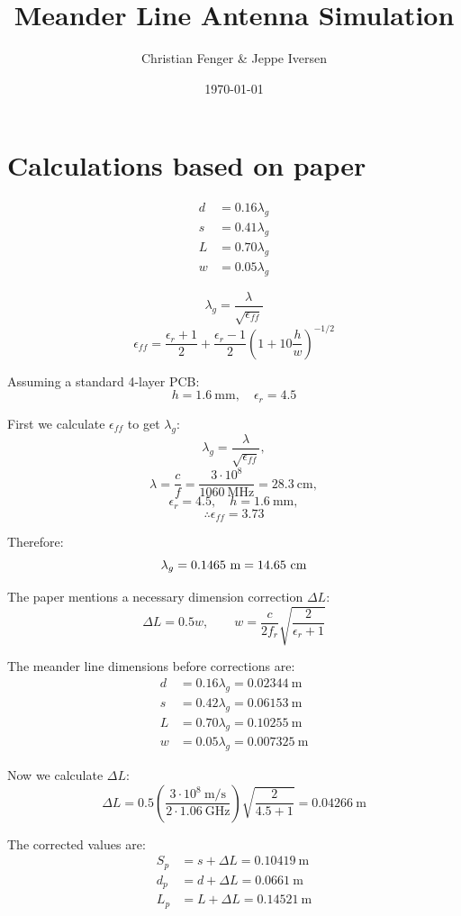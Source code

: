 \documentclass[a4paper,12pt]{article}
\title{Meander Line Antenna Simulation}
\author{Christian Fenger \& Jeppe Iversen}
\date{\today}
\begin{document}
\maketitle

\section*{Calculations based on paper}
\begin{align*}
d &= 0.16\lambda_g \\
s &= 0.41\lambda_g \\
L &= 0.70\lambda_g \\
w &= 0.05\lambda_g
\end{align*}

$$
\lambda_g = \frac{\lambda}{\sqrt{\epsilon_{ff}}}
$$
$$
\epsilon_{ff} = \frac{\epsilon_r+1}{2} + \frac{\epsilon_r-1}{2} \left( 1 + 10\frac{h}{w} \right)^{-1/2}
$$

Assuming a standard 4-layer PCB:
\[
h = 1.6~\text{mm}, \quad \epsilon_r = 4.5
\]

First we calculate $\epsilon_{ff}$ to get $\lambda_g$:
$$\lambda_g = \frac{\lambda}{\sqrt{\epsilon_{ff}}},$$
$$\lambda = \frac{c}{f} = \frac{3\cdot 10^8}{1060~\text{MHz}} = 28.3~\text{cm},$$
$$\epsilon_r = 4.5, \quad h = 1.6~\text{mm},$$
$$ \therefore \epsilon_{ff} = 3.73$$

Therefore:
\[
\lambda_g = 0.1465~\text{m} = 14.65~\text{cm} \\
\]

The paper mentions a necessary dimension correction $\Delta L$:
\[
\Delta L = 0.5 w, \qquad 
w = \frac{c}{2f_r} \sqrt{\frac{2}{\epsilon_r + 1}}
\]

The meander line dimensions before corrections are:
\begin{align*}
d &= 0.16\lambda_g = 0.02344~\text{m} \\
s &= 0.42\lambda_g = 0.06153~\text{m} \\
L &= 0.70\lambda_g = 0.10255~\text{m} \\
w &= 0.05\lambda_g = 0.007325~\text{m}
\end{align*}

Now we calculate $\Delta L$:
\[
\Delta L = 0.5 \left( \frac{3\cdot 10^8~\text{m/s}}{2 \cdot 1.06~\text{GHz}} \right) 
\sqrt{\frac{2}{4.5+1}} = 0.04266~\text{m}
\]

The corrected values are:
\begin{align*}
S_p &= s+\Delta L = 0.10419~\text{m} \\
d_p &= d+\Delta L = 0.0661~\text{m} \\
L_p &= L+\Delta L = 0.14521~\text{m}
\end{align*}
\end{document}
